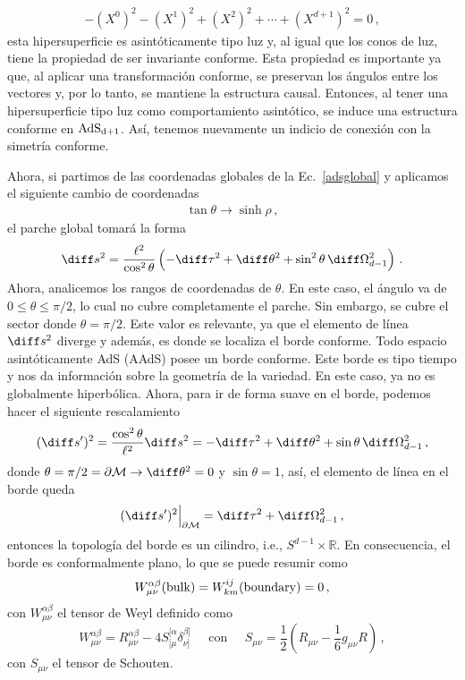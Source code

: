 \documentclass[../Main.tex]{subfiles}
\begin{document}
\begin{align}
-(X^{0})^2-(X^{1})^2+(X^{2})^2+\cdots+(X^{d+1})^2= 0\, ,
\end{align}
esta hipersuperficie es asintóticamente tipo luz y, al igual que los conos de luz, tiene la propiedad de ser invariante conforme. Esta propiedad es importante ya que, al aplicar una transformación conforme, se preservan los ángulos entre los vectores y, por lo tanto, se mantiene la estructura causal. Entonces, al tener una hipersuperficie tipo luz como comportamiento asintótico, se induce una estructura conforme en $\rm AdS_{d+1}$. Así, tenemos nuevamente un indicio de conexión con la simetría conforme.

Ahora, si partimos de las coordenadas globales de la Ec.~\eqref{adsglobal} y aplicamos el siguiente cambio de coordenadas 
\begin{align}
    \tan{\theta}\to\sinh{\rho}\, ,
\end{align}
el parche global tomará la forma
\begin{align}
    \diff s^2=\frac{\ell^2}{\cos^2{\theta}}\left(-\diff\tau^2+\diff\theta^2+\sin^2{\theta}\,\diff\Omega^{2}_{d-1}\right)\, . \label{ads5}
\end{align}
Ahora, analicemos los rangos de coordenadas de $\theta$. En este caso, el ángulo va de $0\leqslant\theta\leqslant\pi/2$, lo cual no cubre completamente el parche. Sin embargo, se cubre el sector donde $\theta=\pi/2$. Este valor es relevante, ya que el elemento de línea $\diff s^2$ diverge y además, es donde se localiza el borde conforme. Todo espacio asintóticamente AdS (AAdS) posee un borde conforme. Este borde es tipo tiempo y nos da información sobre la geometría de la variedad. En este caso, ya no es globalmente hiperbólica. Ahora, para ir de forma suave en el borde, podemos hacer el siguiente rescalamiento 
\begin{align}
 (\diff s')^2=\frac{\cos^2{\theta}}{\ell^2}\diff s^2=-\diff\tau^2+\diff\theta^2+\sin{\theta}\,\diff\Omega^{2}_{d-1}\, ,
\end{align}
donde $\theta=\pi/2=\partial\mathcal{M}\to\diff\theta^2=0$ y $\sin{\theta}=1$, así, el elemento de línea en el borde queda 
\begin{align}
(\diff s')^2\Big|_{\partial\mathcal{M}}= \diff\tau^2+\diff\Omega^{2}_{d-1}\, ,
\end{align}
entonces la topología del borde es un cilindro, i.e., $S^{d-1}\times\mathbb{R}$. En consecuencia, el borde es conformalmente plano, lo que se puede resumir como 
\begin{align}
    W^{\alpha\beta}_{\mu\nu}({\rm bulk})=W^{ij}_{km}({\rm boundary})=0 \, ,
\end{align}
con $W^{\alpha\beta}_{\mu\nu}$ el tensor de Weyl definido como 
\begin{equation}
W_{\mu \nu}^{\alpha \beta}= R_{\mu \nu}^{\alpha \beta} -4S^{[\alpha}_{[\mu} \delta^{\beta]}_{\nu]} \;\;\;\;\; \mbox{con} \;\;\;\;\; S_{\mu\nu} = \frac{1}{2} \left(R_{\mu \nu} - \frac{1}{6} g_{\mu \nu} R\right) \,,
\label{weyltensor}
\end{equation}
con $S_{\mu\nu}$ el tensor de Schouten.
\end{document}
